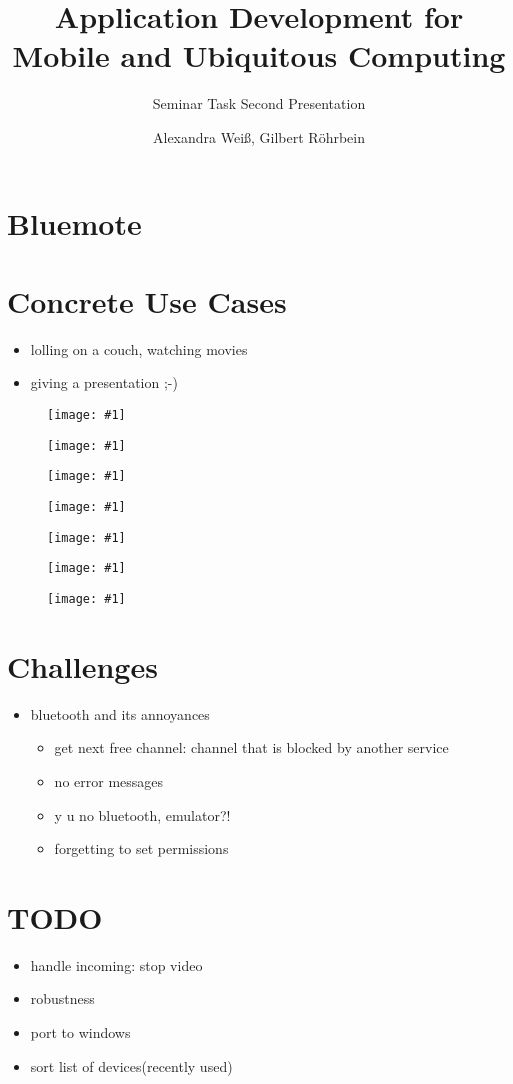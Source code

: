\documentclass[ddc nogerman]{tudbeamer}
\newcommand{\imageframe}[1]{
    \begin{frame}
        \begin{figure}
            \centering
            \texttt{[image: \#1]}
        \end{figure}
    \end{frame}
}
\begin{document}

\title{Application Development for Mobile and Ubiquitous Computing}
\subtitle{Seminar Task Second Presentation}
\author{Alexandra Weiß, Gilbert Röhrbein}

\maketitle

\section{Bluemote}
\begin{frame}
\end{frame}

\section{Concrete Use Cases}
\begin{frame}
    \begin{itemize}
        \item lolling on a couch, watching movies
        \item giving a presentation ;-)
    \end{itemize}
\end{frame}

\imageframe{img/btactivate.png}
\imageframe{img/btauth.png}
\imageframe{img/choosedevice.png}
\imageframe{img/choosefunction.png}
\imageframe{img/presentation.png}
\imageframe{img/vlc.png}

\imageframe{img/components.pdf}

\section{Challenges}
\begin{frame}
    \begin{itemize}
        \item bluetooth and its annoyances
        \begin{itemize}
        	\item get next free channel: channel that is blocked by another service
        	\item no error messages
            \item y u no bluetooth, emulator?!
            \item forgetting to set permissions
        \end{itemize}
    \end{itemize}
\end{frame}

\section{TODO}
\begin{frame}
    \begin{itemize}
        \item handle incoming: stop video
        \item robustness
        \item port to windows
        \item sort list of devices(recently used)
    \end{itemize}
\end{frame}
\end{document}
